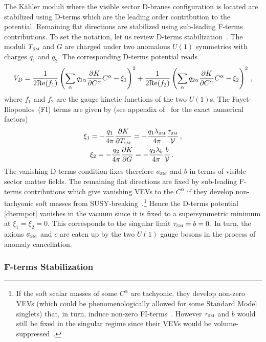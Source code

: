 \documentclass[12pt,a4paper]{book}
\def\SM{{\scriptscriptstyle \rm SM}}
\begin{document}
The K\"ahler moduli where the visible sector D-branes configuration is located are stabilized using D-terms which are the leading order contribution to the potential. Remaining flat directions are stabilized using sub-leading F-terms contributions. To set the notation, let us review D-terms stabilization~\cite{Cicoli:2012vw}. The moduli $T_\SM$ and $G$ are charged under two anomalous $U(1)$ symmetries with charges $q_1$ and $q_2$. The corresponding D-terms potential reads
\begin{align}
V_D = \frac{1}{2{\rm Re}(f_1)} \left(\sum_\alpha q_{1 \alpha} \frac{\partial K}{\partial C^\alpha} C^\alpha - \xi_1\right)^2
+ \frac{1}{2{\rm Re}(f_2)} \left(\sum_\alpha q_{2 \alpha} \frac{\partial K}{\partial C^\alpha} C^\alpha - \xi_2\right)^2\,,
\label{dtermpot}
\end{align}
where $f_1$ and $f_2$ are the gauge kinetic functions of the two $U(1)$s.
The Fayet-Iliopoulos~(FI) terms are given by (see appendix of~\cite{Cicoli:2011yh} for the exact numerical factors)
\begin{align}
\xi_1 &= - \frac{q_1}{4\pi} \frac{\partial K}{\partial T_\SM} = - \frac{q_1  \lambda_\SM}{4\pi} \frac{\tau_\SM}{\mathcal{V}}\,, \label{xiSM} \\
&\xi_2 = - \frac{q_2}{4\pi} \frac{\partial K}{\partial G} = - \frac{q_2 \lambda_b}{4\pi} \frac{b}{\mathcal{V}}\,.
\end{align}
The vanishing D-terms condition fixes therefore $a_\SM$ and $b$ in terms of visible sector matter fields.
The remaining flat directions are fixed by sub-leading F-terms contributions which give vanishing VEVs to the $C^\alpha$ if they develop non-tachyonic soft masses from SUSY-breaking~\cite{Cicoli:2012vw}.\footnote{If the soft scalar masses of some $C^\alpha$ are tachyonic, they develop non-zero VEVs (which could be phenomenologically allowed for some Standard Model singlets) that, in turn, induce non-zero FI-terms~\cite{Cicoli:2013cha}. However $\tau_\SM$ and $b$ would still be fixed in the singular regime since their VEVs would be volume-suppressed~\cite{Cicoli:2013cha}.} Hence the D-terms potential \eqref{dtermpot} vanishes in the vacuum since it is fixed to a supersymmetric minimum at $\xi_1 = \xi_2 = 0$. This corresponds to the singular limit $\tau_\SM = b = 0$. In turn, the axions $a_\SM$ and $c$ are eaten up by the two $U(1)$ gauge bosons in the process of anomaly cancellation.

\subsubsection{F-terms Stabilization}
\end{document}
